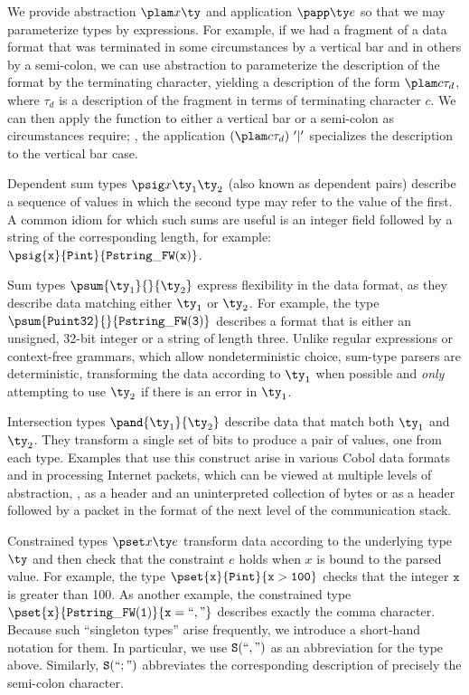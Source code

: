 We provide abstraction $\plam x {} \ty$ and application
$\papp \ty e$ so that we may parameterize types by expressions.  For
example, if we had a fragment of a data format that was terminated in some
circumstances by a vertical bar and in others by a semi-colon, we 
can use abstraction to parameterize the description of the format by
the terminating character, yielding a description of the form
$\plam c {} {\tau_d} $, where $\tau_d$ is a description of the
fragment in terms of terminating character $c$.  We can then
apply the function to either a vertical bar or a semi-colon as
circumstances require; \ie{},  the application $(\plam c {} {\tau_d})
\ \mathtt{'|'}$  specializes the description to the vertical bar case.

Dependent sum types $\psig x {\ty_1} {\ty_2}$ (also known as dependent pairs) describe a sequence
of values in which the second type may refer to the value of the
first.  A common idiom for which such sums are useful is an integer
field followed by a string of the corresponding length, for example: 
$\psig {\mathtt{x}} {\mathtt{Pint}} {\mathtt{Pstring\_FW(x)}}$.

Sum types $\psum {\ty_1} {} {\ty_2}$
express flexibility in the data format, as they describe
data matching either $\ty_1$ or $\ty_2$.  For example, the type
$\psum{\mathtt{Puint32}}{}{\mathtt{Pstring\_FW(3)}}$ describes a format that
is either an unsigned, 32-bit integer or a string of length three.
Unlike regular expressions or
context-free grammars, which allow nondeterministic choice,
sum-type parsers
are deterministic, transforming the data according to $\ty_1$
when possible and {\it only} attempting to
use $\ty_2$ if there is an error in $\ty_1$. 

Intersection types
$\pand {\ty_1} {\ty_2}$ describe data that match both $\ty_1$ and
$\ty_2$. They transform a single set of bits to produce
a pair of values, one from each type.  Examples that use this
construct arise in various Cobol data formats and in processing
Internet packets, which can be viewed at multiple levels of
abstraction, \eg{}, as a header and an uninterpreted collection of
bytes or as a header followed by a packet in the format of the next
level of the communication stack. 

Constrained types $\pset x \ty e$ transform data according to the
underlying type $\ty$ and then check that the constraint $e$ holds
when $x$ is bound to the parsed value. For example, the type 
$\pset {\mathtt{x}} {\mathtt{Pint}} {\mathtt{x > 100}}$ checks that the integer 
$\mathtt{x}$ is greater than 100.  As another example,  the constrained type
$\pset{\mathtt{x}}{\mathtt{Pstring\_FW(1)}}{\mathtt{x = ``,"}}$
describes exactly the comma character. Because such ``singleton
types'' arise frequently, we
introduce a short-hand notation for them.  In particular, we use
$\mathtt{S(``,")}$ as an abbreviation for the type above. Similarly,
$\mathtt{S(``;")}$  abbreviates the corresponding description of precisely
the semi-colon character.

